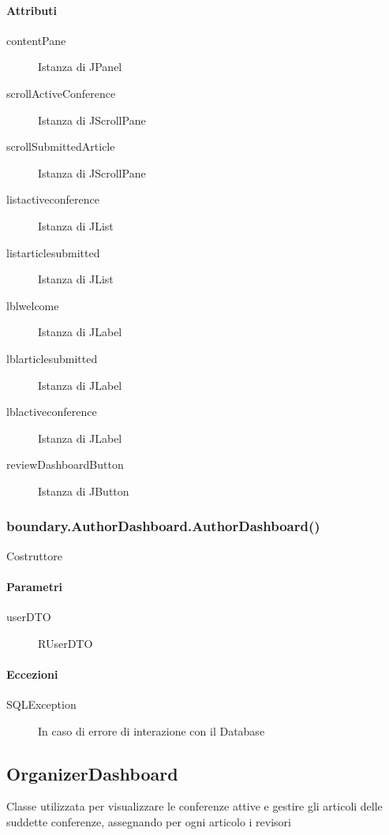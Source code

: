 \paragraph{Attributi}
\begin{description}
\item[contentPane] Istanza di JPanel 
\item[scrollActiveConference] Istanza di JScrollPane
\item[scrollSubmittedArticle] Istanza di JScrollPane
\item[listactiveconference] Istanza di JList
\item[listarticlesubmitted] Istanza di JList
\item[lblwelcome] Istanza di JLabel
\item[lblarticlesubmitted] Istanza di JLabel
\item[lblactiveconference] Istanza di JLabel
\item[reviewDashboardButton] Istanza di JButton
\end{description}

\subsubsection{boundary.AuthorDashboard.AuthorDashboard()}
Costruttore
\paragraph{Parametri}
\begin{description}
\item[userDTO] RUserDTO
\end{description}
\paragraph{Eccezioni}
\begin{description}
\item[SQLException] In caso di errore di interazione con il Database
\end{description}

\subsection{OrganizerDashboard}
Classe utilizzata per visualizzare le conferenze attive e gestire gli articoli delle suddette conferenze, assegnando per ogni articolo i revisori
